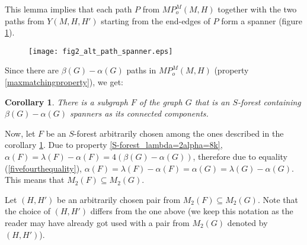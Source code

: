 \documentclass[a4paper, 12pt]{article}
\newtheorem{corollary}[lemma]{Corollary}
\begin{document}
This lemma implies that each path $P$ from $MP_o^M(M,H)$ together
with the two paths from $Y(M,H,H')$ starting from the end-edges of
$P$ form a spanner (figure \ref{fig_alt_path_spanner}).

\begin{figure}[h]
\begin{center}
\texttt{[image: fig2\_alt\_path\_spanner.eps]}\\
\caption{}\label{fig_alt_path_spanner}
\end{center}
\end{figure}

Since there are $\beta(G) - \alpha(G)$ paths in $MP_o^M(M,H)$
(property \ref{maxmatchingproperty}), we get:
\begin{corollary}\label{subgraph_F}
There is a subgraph $F$ of the graph $G$ that is an $S$-forest
containing $\beta(G) - \alpha(G)$ spanners as its connected
components.
\end{corollary}

 Now, let $F$ be an $S$-forest arbitrarily chosen among the ones described in the corollary \ref{subgraph_F}.
 Due to property \ref{S-forest_lambda=2alpha=8k}, $\alpha(F) = \lambda(F) - \alpha(F) = 4(\beta(G) -
 \alpha(G))$, therefore due to equality (\ref{fivefourthequality}), $\alpha(F) = \lambda(F) - \alpha(F) = \alpha(G) = \lambda(G) -
 \alpha(G)$. This means that $M_2(F) \subseteq M_2(G)$.

\bigskip

Let $(H, H')$ be an arbitrarily chosen pair from $M_2(F) \subseteq
M_2(G)$. Note that the choice of $(H,H')$ differs from the one above
(we keep this notation as the reader may have already got used with
a pair from $M_2(G)$ denoted by $(H,H')$).

\vspace*{0.4cm}
\end{document}
